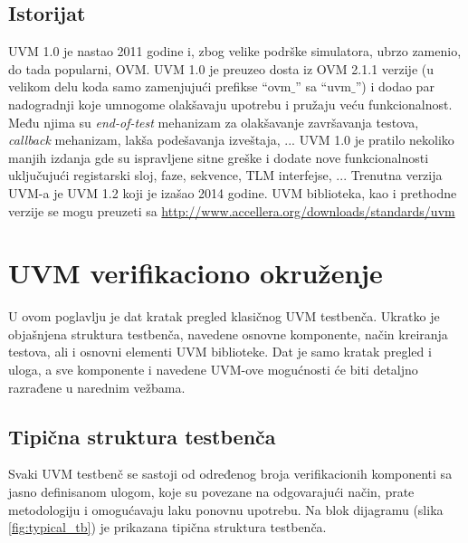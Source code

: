 
\subsection{Istorijat}

UVM 1.0 je nastao 2011 godine i, zbog velike podrške simulatora, ubrzo zamenio,
do tada popularni, OVM. UVM 1.0 je preuzeo dosta iz OVM 2.1.1 verzije (u velikom
delu koda samo zamenjujući prefikse ``ovm\(\_\)'' sa ``uvm\(\_\)'') i dodao par
nadogradnji koje umnogome olakšavaju upotrebu i pružaju veću funkcionalnost.
Među njima su \emph{end-of-test} mehanizam za olakšavanje završavanja testova,
\emph{callback} mehanizam, lakša podešavanja izveštaja, ... UVM 1.0 je pratilo
nekoliko manjih izdanja gde su ispravljene sitne greške i dodate nove
funkcionalnosti uključujući registarski sloj, faze, sekvence, TLM interfejse,
... Trenutna verzija UVM-a je UVM 1.2 koji je izašao 2014 godine. UVM
biblioteka, kao i prethodne verzije se mogu preuzeti sa
\url{http://www.accellera.org/downloads/standards/uvm}


\section{UVM verifikaciono okruženje}

U ovom poglavlju je dat kratak pregled klasičnog UVM testbenča. Ukratko je
objašnjena struktura testbenča, navedene osnovne komponente, način kreiranja
testova, ali i osnovni elementi UVM biblioteke. Dat je samo kratak pregled i
uloga, a sve komponente i navedene UVM-ove mogućnosti će biti detaljno
razrađene u narednim vežbama.


\subsection{Tipična struktura testbenča}

Svaki UVM testbenč se sastoji od određenog broja verifikacionih komponenti sa
jasno definisanom ulogom, koje su povezane na odgovarajući način, prate
metodologiju i omogućavaju laku ponovnu upotrebu. Na blok dijagramu (slika
\ref{fig:typical_tb}) je prikazana tipična struktura testbenča.\\


